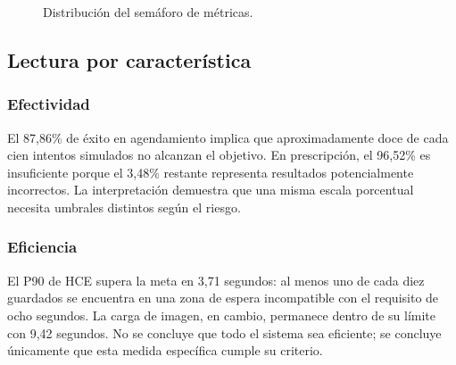 \begin{figure}[H]
\centering
{}
\caption{Distribución del semáforo de métricas.}
\end{figure}

\subsection{Lectura por característica}

\subsubsection{Efectividad}

El 87,86\% de éxito en agendamiento implica que aproximadamente doce de cada cien intentos simulados no alcanzan el objetivo. En prescripción, el 96,52\% es insuficiente porque el 3,48\% restante representa resultados potencialmente incorrectos. La interpretación demuestra que una misma escala porcentual necesita umbrales distintos según el riesgo.

\subsubsection{Eficiencia}

El P90 de HCE supera la meta en 3,71 segundos: al menos uno de cada diez guardados se encuentra en una zona de espera incompatible con el requisito de ocho segundos. La carga de imagen, en cambio, permanece dentro de su límite con 9,42 segundos. No se concluye que todo el sistema sea eficiente; se concluye únicamente que esta medida específica cumple su criterio.

